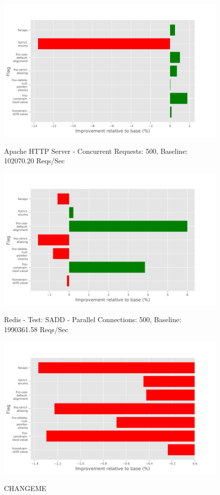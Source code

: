 \documentclass{sciposter}
\begin{document}
\begin{multicols}{3}
\begin{figure}[h!]
\centering
\includegraphics[scale=1.3]{apache} \\
\caption{Apache HTTP Server - Concurrent Requests: 500, Baseline: 102070.20 Reqs/Sec}
\end{figure}

\begin{figure}[h!]
\centering
\includegraphics[scale=1.3]{redis} \\
\caption{Redis - Test: SADD - Parallel Connections: 500, Baseline: 1990361.58 Reqs/Sec}
\end{figure}

\begin{figure}[h!]
\centering
\includegraphics[scale=1.3]{zstd} \\
\caption{CHANGEME}
\end{figure}


\end{multicols}
\end{document}
